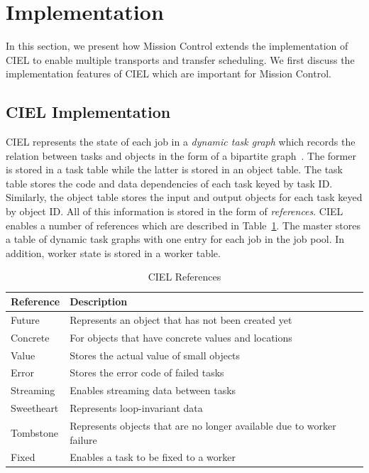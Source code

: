 \documentclass[a4paper,12pt,twoside,openright]{report}
\begin{document}
\section{Implementation}
In this section, we present how Mission Control extends the implementation of
CIEL to enable multiple transports and transfer scheduling. We first discuss the
implementation features of CIEL which are important for Mission Control.

\subsection{CIEL Implementation}
CIEL represents the state of each job in a \emph{dynamic task graph} which
records the relation between tasks and objects in the form of a bipartite
graph~\cite{Murray:2011:CUE,Murray:2011:ADE}. The former is stored in a task
table while the latter is stored in an object table. The task table stores the
code and data dependencies of each task keyed by task ID. Similarly, the object
table stores the input and output objects for each task keyed by object ID. All
of this information is stored in the form of \emph{references}. CIEL enables a
number of references which are described in
Table~\ref{chap:implem:sec:ciel:tab:ref}. The master stores a table of dynamic
task graphs with one entry for each job in the job pool. In addition, worker
state is stored in a worker table.

\begin{table}
  \centering
  \begin{tabular}{| l || l |}
    \hline
	\textbf{Reference} & \textbf{Description} \\ \hline \hline
    Future & Represents an object that has not been created yet \\ \hline
    Concrete &  For objects that have concrete values and locations \\ \hline
    Value & Stores the actual value of small objects \\ \hline
    Error & Stores the error code of failed tasks \\ \hline
    Streaming & Enables streaming data between tasks \\ \hline
    Sweetheart & Represents loop-invariant data \\ \hline
    Tombstone & Represents objects that are no longer available due to worker
    failure
    \\ \hline
    Fixed & Enables a task to be fixed to a worker\\
    \hline
  \end{tabular}
  \caption{CIEL References}
  \label{chap:implem:sec:ciel:tab:ref}
\end{table}
\end{document}

